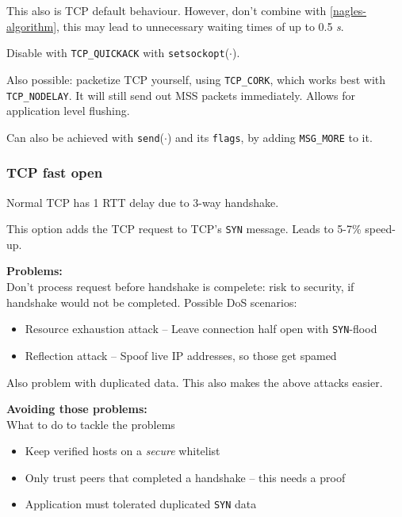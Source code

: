 \documentclass[english]{panikzettel}
\newcommand{\fkt}[1]{\texttt{#1}(\(\cdot\))}
\begin{document}
	This also is TCP default behaviour.
	However, don't combine with \cref{nagles-algorithm}, this may lead to unnecessary waiting times of up to 0.5 \textit{s}. 
	
	Disable with \texttt{TCP\_QUICKACK} with \fkt{setsockopt}.

	Also possible: packetize TCP yourself, using \texttt{TCP\_CORK}, which works best with \texttt{TCP\_NODELAY}.
	It will still send out MSS packets immediately.
	Allows for application level flushing.

	Can also be achieved with \fkt{send} and its \texttt{flags}, by adding \texttt{MSG\_MORE} to it.

	\subsubsection{TCP fast open}
	\label{tcp-fast-open}
	
	Normal TCP has 1 RTT delay due to 3-way handshake.

	This option adds the TCP request to TCP's \texttt{SYN} message.
	Leads to 5-7\% speed-up. 

	\textbf{Problems:}\\
	Don't process request before handshake is compelete: risk to security, if handshake would not be completed. Possible DoS scenarios:
	\begin{itemize}
		\item Resource exhaustion attack – Leave connection half open with \texttt{SYN}-flood	
		\item Reflection attack – Spoof live IP addresses, so those get spamed
	\end{itemize}
	Also problem with duplicated data. This also makes the above attacks easier.

	\textbf{Avoiding those problems:}\\
	What to do to tackle the problems
	\begin{itemize}
		\item Keep verified hosts on a \textit{secure} whitelist
		\item Only trust peers that completed a handshake – this needs a proof
		\item Application must tolerated duplicated \texttt{SYN} data
	\end{itemize}
\end{document}
